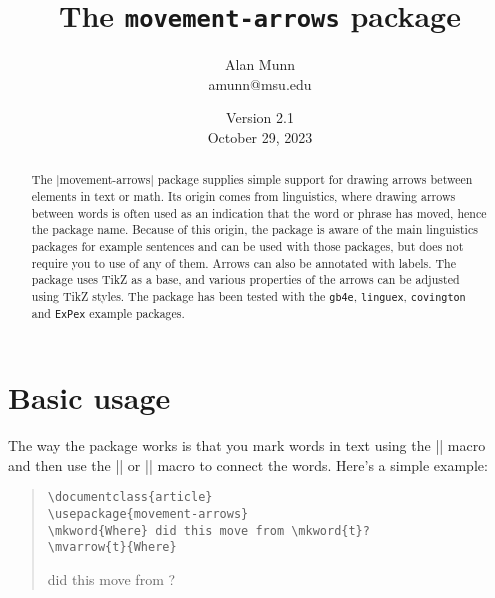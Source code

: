\documentclass[11pt]{article}
\title{The \texttt{movement-arrows} package}
\author{Alan Munn\\amunn@msu.edu}
\date{Version 2.1\\October 29, 2023}
\newcommand*{\pkg}[1]{\texttt{#1}}
\begin{document}
\maketitle
\thispagestyle{empty}
\begin{abstract}{\noindent
The |movement-arrows| package supplies simple support for drawing  arrows between elements in text or math. Its origin comes from linguistics, where drawing arrows between words is often used as an indication that the word or phrase has moved, hence the package name.  Because of this origin, the package is aware of the main linguistics packages for example sentences and can be used with those packages, but does not require you to use of any of them.  Arrows can also be annotated with labels.  The package uses TikZ as a base, and various properties of the arrows can be adjusted using TikZ styles. The package has been tested with the \pkg{gb4e}, \pkg{linguex}, \pkg{covington} and \pkg{ExPex} example packages.
}
\end{abstract}

\section{Basic usage}
The way the package works is that you mark words in text using the |\mkword| macro and then use the |\mvarrow| or |\mvlink| macro to connect the words.  Here's a simple example:

\begin{quote}
\begin{lstlisting}
\documentclass{article}
\usepackage{movement-arrows}
\mkword{Where} did this move from \mkword{t}?
\mvarrow{t}{Where}
\end{lstlisting}
 did this move from ?
\end{quote}
\end{document}
